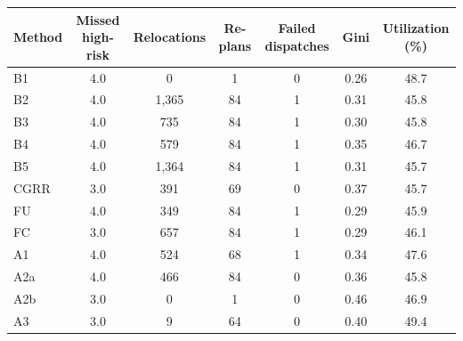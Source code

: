\documentclass[10pt]{article}
\begin{document}
\vspace{4mm}\begin{tabular}{lcccccc}\toprule Method & Missed high-risk & Relocations & Re-plans & Failed dispatches & Gini & Utilization (\%)\\\midrule
B1 & 4.0 & 0 & 1 & 0 & 0.26 & 48.7\\
B2 & 4.0 & 1,365 & 84 & 1 & 0.31 & 45.8\\
B3 & 4.0 & 735 & 84 & 1 & 0.30 & 45.8\\
B4 & 4.0 & 579 & 84 & 1 & 0.35 & 46.7\\
B5 & 4.0 & 1,364 & 84 & 1 & 0.31 & 45.7\\
CGRR & 3.0 & 391 & 69 & 0 & 0.37 & 45.7\\
FU & 4.0 & 349 & 84 & 1 & 0.29 & 45.9\\
FC & 3.0 & 657 & 84 & 1 & 0.29 & 46.1\\
A1 & 4.0 & 524 & 68 & 1 & 0.34 & 47.6\\
A2a & 4.0 & 466 & 84 & 0 & 0.36 & 45.8\\
A2b & 3.0 & 0 & 1 & 0 & 0.46 & 46.9\\
A3 & 3.0 & 9 & 64 & 0 & 0.40 & 49.4\\
\bottomrule\end{tabular}\normalsize
\clearpage
\end{document}
